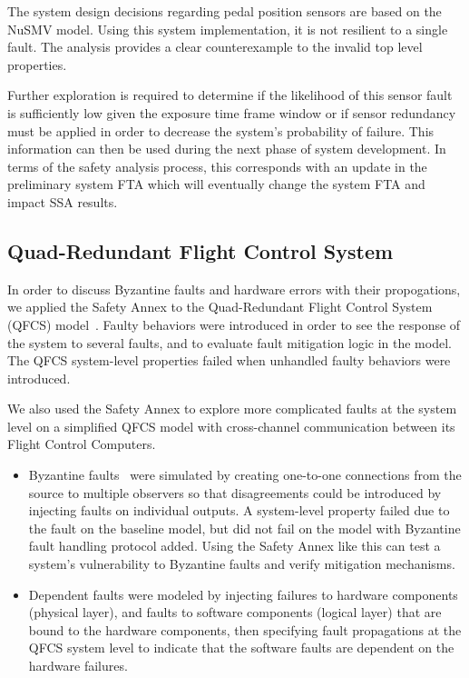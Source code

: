 The system design decisions regarding pedal position sensors are based on the NuSMV model. Using this system implementation, it is not resilient to a single fault. The analysis provides a clear counterexample to the invalid top level properties. 

Further exploration is required to determine if the likelihood of this sensor fault is sufficiently low given the exposure time frame window or if sensor redundancy must be applied in order to decrease the system's probability of failure. This information can then be used during the next phase of system development. In terms of the safety analysis process, this corresponds with an update in the preliminary system FTA which will eventually change the system FTA and impact SSA results. 

\subsection{Quad-Redundant Flight Control System}
In order to discuss Byzantine faults and hardware errors with their propogations, we applied the Safety Annex to the Quad-Redundant Flight Control System (QFCS) model~\cite{QFCS15:backes}. Faulty behaviors were introduced in order to see the response of the system to several faults, and to evaluate fault mitigation logic in the model.  The QFCS system-level properties failed when unhandled faulty behaviors were introduced.

We also used the Safety Annex to explore more complicated faults at the system level on a simplified QFCS model with cross-channel communication between its Flight Control Computers.

\begin{itemize} 
	\item Byzantine faults~\cite{Driscoll-Byzantine-Fault} were simulated by creating one-to-one connections from the source to multiple observers so that disagreements could be introduced by injecting faults on individual outputs. A system-level property failed due to the fault on the baseline model, but did not fail on the model with Byzantine fault handling protocol added. Using the Safety Annex like this can test a system's vulnerability to Byzantine faults and verify mitigation mechanisms.
	
	\item Dependent faults were modeled by injecting failures to hardware components (physical layer), and faults to software components (logical layer) that are bound to the hardware components, then specifying fault propagations at the QFCS system level to indicate that the software faults are dependent on the hardware failures.
\end{itemize}


